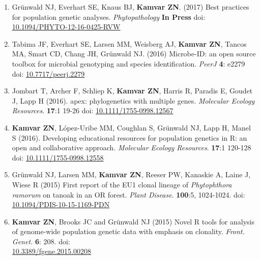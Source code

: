 \documentclass[12pt,letterpaper]{article}
\begin{document}
\begin{enumerate}[leftmargin = 14pt]

	\item Gr\"unwald NJ, Everhart SE, Knaus BJ, \textbf{Kamvar ZN}. (2017)
	Best practices for population genetic analyses. \textit{Phytopathology}
	\textbf{In Press} doi: \href{http://dx.doi.org/10.1094/PHYTO-12-16-0425-RVW}{10.1094/PHYTO-12-16-0425-RVW}

	\vspace{6pt}

	\item Tabima JF, Everhart SE, Larsen MM, Weisberg AJ, \textbf{Kamvar ZN}, Tancos MA,
	Smart CD, Chang JH, Gr\"unwald NJ. (2016) Microbe-ID: an open source toolbox
	for microbial genotyping and species identification. \textit{PeerJ} \textbf{4}: e2279
	doi: \href{https://doi.org/10.7717/peerj.2279}{10.7717/peerj.2279}
	
	\vspace{6pt}
	
	\item Jombart T, Archer F, Schliep K, \textbf{Kamvar ZN}, Harris R, Paradis
	E, Goudet J, Lapp H (2016). apex: phylogenetics with multiple genes.
	\textit{Molecular Ecology Resources}. \textbf{17}:1 19-26 doi:
	\href{http://dx.doi.org/10.1111/1755-0998.12567}{10.1111/1755-0998.12567}
	
	\vspace{6pt}

	\item \textbf{Kamvar ZN}, L\'opez-Uribe MM, Coughlan S, Gr\"unwald NJ, Lapp
	H, Manel S (2016). Developing educational resources for population genetics
	in R: an open and collaborative approach. \textit{Molecular Ecology Resources}. 
	\textbf{17}:1 120-128 doi:
	\href{http://dx.doi.org/10.1111/1755-0998.12558}{10.1111/1755-0998.12558}
	
	\vspace{6pt}

	\item Gr\"unwald NJ, Larsen MM, \textbf{Kamvar ZN}, Reeser PW, Kanaskie A,
	Laine J, Wiese R (2015) First report of the EU1 clonal lineage of
	\textit{Phytophthora ramorum} on tanoak in an OR forest. 
	\textit{Plant Disease}. \textbf{100}:5, 1024-1024. doi:
	\href{http://dx.doi.org/10.1094/PDIS-10-15-1169-PDN}{10.1094/PDIS-10-15-1169-PDN}
	
	\vspace{6pt}

	\item \textbf{Kamvar ZN}, Brooks JC and Gr\"unwald NJ (2015) Novel R tools for
	analysis of genome-wide population genetic data with emphasis on clonality.
	\textit{Front. Genet.} \textbf{6}: 208. doi: \\
	\href{http://dx.doi.org/10.3389/fgene.2015.00208}{10.3389/fgene.2015.00208}
	

\end{enumerate}
\end{document}
